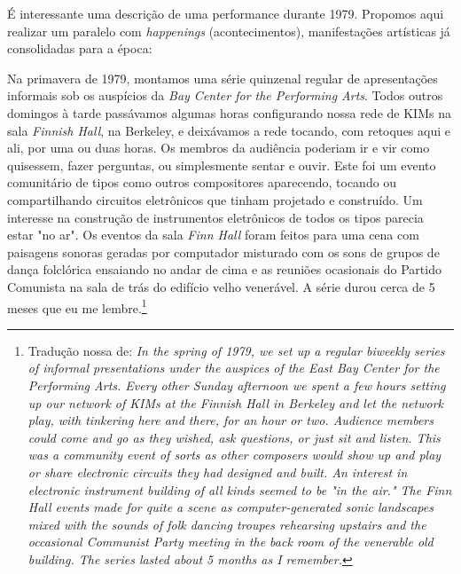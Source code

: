 
É interessante uma descrição de uma performance durante 1979. Propomos aqui realizar um paralelo com \emph{happenings} (acontecimentos), manifestações artísticas já consolidadas para a época:

\begin{citacao}
Na primavera de 1979, montamos uma série quinzenal regular de apresentações informais sob os auspícios da \emph{Bay Center for the Performing Arts}. Todos outros domingos à tarde passávamos algumas horas configurando nossa rede de KIMs na sala \emph{Finnish Hall}, na Berkeley, e deixávamos a rede tocando, com retoques aqui e ali, por uma ou duas horas. Os membros da audiência poderiam ir e vir como quisessem, fazer perguntas, ou simplesmente sentar e ouvir. Este foi um evento comunitário de tipos como outros compositores aparecendo, tocando ou compartilhando circuitos eletrônicos que tinham projetado e construído. Um interesse na construção de instrumentos eletrônicos de todos os tipos parecia estar "no ar". Os eventos da sala \emph{Finn Hall} foram feitos para uma cena com paisagens sonoras geradas por computador misturado com os sons de grupos de dança folclórica ensaiando no andar de cima e as reuniões ocasionais do Partido Comunista na sala de trás do edifício velho venerável. A série durou cerca de 5 meses que eu me lembre.\cite[online]{brown_indigenous_2013}\footnote{Tradução nossa de: \emph{In the spring of 1979, we set up a regular biweekly series of informal presentations under the auspices of the East Bay Center for the Performing Arts. Every other Sunday afternoon we spent a few hours setting up our network of KIMs at the Finnish Hall in Berkeley and let the network play, with tinkering here and there, for an hour or two. Audience members could come and go as they wished, ask questions, or just sit and listen. This was a community event of sorts as other composers would show up and play or share electronic circuits they had designed and built. An interest in electronic instrument building of all kinds seemed to be "in the air." The Finn Hall events made for quite a scene as computer-generated sonic landscapes mixed with the sounds of folk dancing troupes rehearsing upstairs and the occasional Communist Party meeting in the back room of the venerable old building. The series lasted about 5 months as I remember.}}
\end{citacao}

